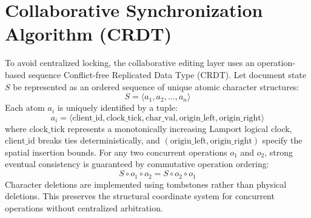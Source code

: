 \documentclass[12pt,a4paper]{report}
\begin{document}
\section{Collaborative Synchronization Algorithm (CRDT)}
To avoid centralized locking, the collaborative editing layer uses an operation-based sequence Conflict-free Replicated Data Type (CRDT). Let document state $S$ be represented as an ordered sequence of unique atomic character structures:
\begin{equation}
    S = \langle a_1, a_2, \dots, a_n \rangle
\end{equation}
Each atom $a_i$ is uniquely identified by a tuple:
\begin{equation}
    a_i = \langle \text{client\_id}, \text{clock\_tick}, \text{char\_val}, \text{origin\_left}, \text{origin\_right} \rangle
\end{equation}
where $\text{clock\_tick}$ represents a monotonically increasing Lamport logical clock, $\text{client\_id}$ breaks ties deterministically, and $(\text{origin\_left}, \text{origin\_right})$ specify the spatial insertion bounds. For any two concurrent operations $o_1$ and $o_2$, strong eventual consistency is guaranteed by commutative operation ordering:
\begin{equation}
    S \circ o_1 \circ o_2 = S \circ o_2 \circ o_1
\end{equation}
Character deletions are implemented using tombstones rather than physical deletions. This preserves the structural coordinate system for concurrent operations without centralized arbitration.
\end{document}
